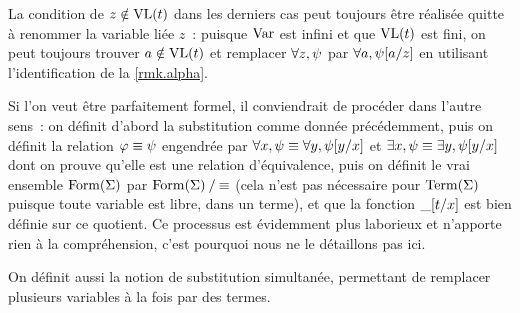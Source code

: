 \begin{remark}
  La condition de $z\notin\operatorname{VL}(t)$ dans les derniers cas peut toujours être
  réalisée quitte à renommer la variable liée $z$~: puisque $\operatorname{Var}$ est infini
  et que $\operatorname{VL}(t)$ est fini, on peut toujours trouver $a\notin\operatorname{VL}(t)$ et
  remplacer $\forall z, \psi$ par $\forall a, \psi[a/z]$ en utilisant
  l'identification de la \cref{rmk.alpha}.

  Si l'on veut être parfaitement formel, il conviendrait de procéder dans
  l'autre sens~: on définit d'abord la substitution comme donnée précédemment,
  puis on définit la relation $\varphi \equiv \psi$ engendrée par
  $\forall x, \psi \equiv \forall y, \psi[y/x]$ et
  $\exists x,\psi \equiv\exists y, \psi[y/x]$ dont on prouve qu'elle est une
  relation d'équivalence, puis on définit le \og vrai\fg{} ensemble
  $\operatorname{Form}(\Sigma)$ par $\mathord{\operatorname{Form}(\Sigma)}\mathbin{/}\mathord{\equiv}$ (cela n'est pas
  nécessaire pour $\operatorname{Term}(\Sigma)$ puisque toute variable est libre, dans un
  terme), et que la fonction $\mathord{\_}[t/x]$ est bien définie sur ce quotient. Ce
  processus est évidemment plus laborieux et n'apporte rien à la compréhension,
  c'est pourquoi nous ne le détaillons pas ici.
\end{remark}

On définit aussi la notion de substitution simultanée, permettant de remplacer
plusieurs variables à la fois par des termes.

